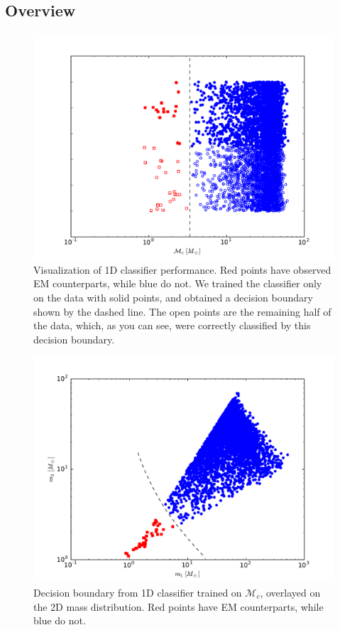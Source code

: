 \subsection{Overview}

\begin{figure}[ht]
  \includegraphics[width=\textwidth]{img/classifier_comparison}
  \caption{Visualization of 1D classifier performance. Red points have observed EM counterparts, while blue do not. We trained the classifier only on the data with solid points, and obtained a decision boundary shown by the dashed line. The open points are the remaining half of the data, which, as you can see, were correctly classified by this decision boundary.}
  \label{fig:class}
\end{figure}

\begin{figure}[ht]
  \includegraphics[width=\textwidth]{img/mass-distribution}
  \caption{Decision boundary from 1D classifier trained on $\mathcal{M}_c$, overlayed on the 2D mass distribution. Red points have EM counterparts, while blue do not.}
  \label{fig:2D}
\end{figure}


